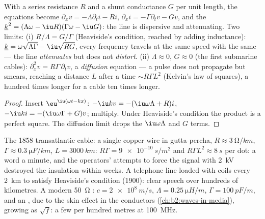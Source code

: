 \begin{proposition}\label{prop:b2:dispersion-wave-packets:lossy}
With a series resistance $R$ and a shunt conductance $G$ per unit
length, the equations become $\partial_xv = -\Lambda\partial_ti - Ri$, $\partial_xi =
-\Gamma\partial_tv - Gv$, and the  $\underline k^2 = (\Lambda\omega -
\iu R)(\Gamma\omega - \iu G)$: the line is dispersive and attenuating. Two
limits: (i) $R/\Lambda = G/\Gamma$ (Heaviside's condition, reached by adding
inductance): $\underline k = \omega\sqrt{\Lambda\Gamma} - \iu\sqrt{RG}$, every frequency
travels at the same speed with the same  --- the line
\emph{attenuates} but does not \emph{distort}. (ii) $\Lambda \approx 0$, $G \approx 0$
(the first submarine cables): $\partial_x^2v = R\Gamma\,\partial_tv$, a
\emph{diffusion} equation --- a pulse does not propagate but smears,
reaching a distance $L$ after a time $\sim R\Gamma L^2$ (Kelvin's law of
squares), a hundred times longer for a cable ten times longer.
\end{proposition}

\begin{proof}
Insert $\eu^{\iu(\omega t - kx)}$: $-\iu kv = -(\iu\omega\Lambda + R)i$, $-\iu ki = -(\iu
\omega\Gamma + G)v$; multiply. Under Heaviside's condition the product is a
perfect square. The diffusion limit drops the $\iu\omega\Lambda$ and $G$ terms.
\end{proof}

\begin{example}\label{ex:b2:dispersion-wave-packets:cables}
The 1858 transatlantic cable: a single copper wire in gutta-percha,
$R \approx \qty{3}{\ohm/km}$, $\Gamma \approx \qty{0.3}{\micro F/km}$, $L = \qty{3000}{km}$:
$R\Gamma = \qty{9e-10}{s/m^2}$ and $R\Gamma L^2 \approx \qty{8}{s}$ per dot: a word a
minute, and the operators' attempts to force the signal
with \qty{2}{kV} destroyed the insulation within weeks. A telephone line
loaded with coils every \qty{2}{km} to satisfy Heaviside's condition
(1900): clear speech over hundreds of kilometres. A modern \qty{50}{\ohm}
: $c = \qty{2e8}{m/s}$, $\Lambda = \qty{0.25}{\micro H/m}$, $\Gamma =
\qty{100}{pF/m}$, and an , due to the skin effect in the
conductors (\cref{ch:b2:waves-in-media}), growing as $\sqrt f$: a few
 per hundred metres at \qty{100}{MHz}.
\end{example}


